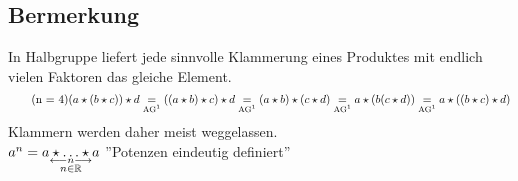 \subsection{Bermerkung}\label{sec:1.4}
In Halbgruppe liefert jede sinnvolle Klammerung eines Produktes mit endlich vielen Faktoren das gleiche Element.\\
\begin{equation}
\tag{n = 4}
(a \star (b \star c)) \star d \underset{\text{AG\footnotemark[1]}}{=} ((a \star b)\star c)\star d \underset{\text{AG\footnotemark[1]}}{=} (a \star b) \star (c \star d) \underset{\text{AG\footnotemark[1]}}{=} a \star (b (c \star d)) \underset{\text{AG\footnotemark}}{=} a \star ((b \star c)\star d)
\end{equation}
Klammern werden daher meist weggelassen.\\
$a^n = \underset{\substack{\longleftarrow n \longrightarrow\\
n \in \mathbb{R}}}{a\star\ldots\star a}$ ''Potenzen eindeutig definiert''
